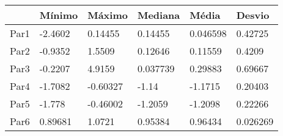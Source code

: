 \begin{tabular}{llllll}
& Mínimo & Máximo & Mediana & Média & Desvio \\ 
\hline 
Par1 & -2.4602 & 0.14455 & 0.14455 & 0.046598 & 0.42725 \\ 
Par2 & -0.9352 & 1.5509 & 0.12646 & 0.11559 & 0.4209 \\ 
Par3 & -0.2207 & 4.9159 & 0.037739 & 0.29883 & 0.69667 \\ 
Par4 & -1.7082 & -0.60327 & -1.14 & -1.1715 & 0.20403 \\ 
Par5 & -1.778 & -0.46002 & -1.2059 & -1.2098 & 0.22266 \\ 
Par6 & 0.89681 & 1.0721 & 0.95384 & 0.96434 & 0.026269 \\ 
\hline 
\end{tabular}